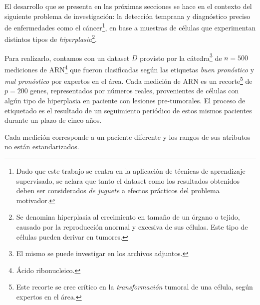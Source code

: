 El desarrollo que se presenta en las próximas secciones se hace en el contexto del siguiente problema de investigación: la detección temprana y diagnóstico preciso de enfermedades como el cáncer\footnote{Dado que este trabajo se centra en la aplicación de técnicas de aprendizaje supervisado, se aclara que tanto el dataset como los resultados obtenidos deben ser considerados \textit{de juguete} a efectos prácticos del problema motivador.}, en base a muestras de células que experimentan distintos tipos de \textit{hiperplasia}\footnote{Se denomina hiperplasia al crecimiento en tamaño de un órgano o tejido, causado por la reproducción anormal y excesiva de sus células. Este tipo de células pueden derivar en tumores.}. 

Para realizarlo, contamos con un dataset $D$ provisto por la cátedra\footnote{El mismo se puede investigar en los archivos adjuntos.} de $n=500$ mediciones de ARN\footnote{Ácido ribonucleico.} que fueron clasificadas según las etiquetas \textit{buen pronóstico} y \textit{mal pronóstico} por expertos en el área. Cada medición de ARN es un recorte\footnote{Este recorte se cree crítico en la \textit{transformación} tumoral de una célula, según expertos en el área.} de $p=200$ genes, representados por números reales, provenientes de células con algún tipo de hiperplasia en paciente con lesiones pre-tumorales. El proceso de etiquetado es el resultado de un seguimiento periódico de estos mismos pacientes durante un plazo de cinco años.

Cada medición corresponde a un paciente diferente y los rangos de sus atributos no están estandarizados. 